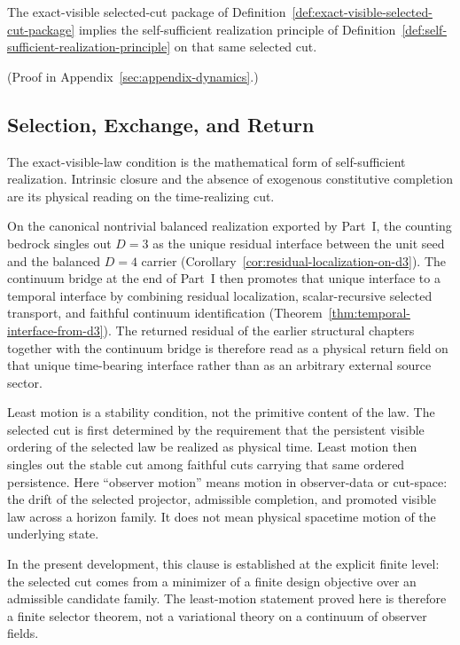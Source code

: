 \begin{theorem}
\label{thm:exact-visible-selected-cut-package-forces-self-sufficient-realization}
The exact-visible selected-cut package of
Definition~\ref{def:exact-visible-selected-cut-package} implies the
self-sufficient realization principle of
Definition~\ref{def:self-sufficient-realization-principle} on that same
selected cut.
\end{theorem}

(Proof in Appendix~\ref{sec:appendix-dynamics}.)

\subsection{Selection, Exchange, and Return}

The exact-visible-law condition is the mathematical form of self-sufficient
realization. Intrinsic closure and the absence of exogenous constitutive
completion are its physical reading on the time-realizing cut.

On the canonical nontrivial balanced realization exported by Part~I, the
counting bedrock singles out \(D=3\) as the unique residual interface between
the unit seed and the balanced \(D=4\) carrier
(Corollary~\ref{cor:residual-localization-on-d3}). The continuum bridge at the
end of Part~I then promotes that
unique interface to a temporal interface by combining residual localization,
scalar-recursive selected transport, and faithful continuum identification
(Theorem~\ref{thm:temporal-interface-from-d3}). The returned residual of
the earlier structural chapters together with the continuum bridge is therefore
read as a physical return field on that unique
time-bearing interface rather than as an arbitrary external source sector.

Least motion is a stability condition, not the primitive content of the law.
The selected cut is first determined by the requirement that the persistent
visible ordering of the selected law be realized as physical time. Least
motion then singles out the stable cut among faithful cuts carrying that same
ordered persistence. Here ``observer motion'' means motion in observer-data or
cut-space: the drift of the selected projector, admissible completion, and
promoted visible law across a horizon family. It does not mean physical
spacetime motion of the underlying state.

In the present development, this clause is established at the explicit finite
level: the selected cut comes from a minimizer of a finite design objective
over an admissible candidate family. The least-motion statement proved here is
therefore a finite selector theorem, not a variational theory on a continuum
of observer fields.

